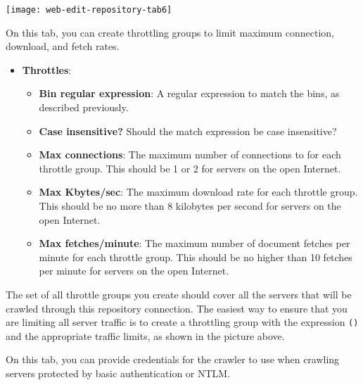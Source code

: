 \texttt{[image: web-edit-repository-tab6]}

On this tab, you can create throttling groups to limit maximum
connection, download, and fetch rates.

\begin{itemize}


\item \textbf{Throttles}:

\begin{itemize}

\item \textbf{Bin regular expression}: A regular expression to match the bins, as described previously.

\item \textbf{Case insensitive?} Should the match expression be case insensitive?

\item \textbf{Max connections}: The maximum number of connections to for each throttle group. This should be 1 or 2 for servers on the open Internet.

\item \textbf{Max Kbytes/sec}: The maximum download rate for each throttle group. This should be no more than 8 kilobytes per second for servers on the open Internet.

\item \textbf{Max fetches/minute}: The maximum number of document fetches per minute for each throttle group. This should be no higher than 10 fetches per minute for servers on the open Internet.

\end{itemize}

\end{itemize}

The set of all throttle groups you create should cover all the servers
that will be crawled through this repository connection. The easiest
way to ensure that you are limiting all server traffic is to create a
throttling group with the expression \texttt{()} and the appropriate
traffic limits, as shown in the picture above.



On this tab, you can provide credentials for the crawler to use when
crawling servers protected by basic authentication or NTLM.


